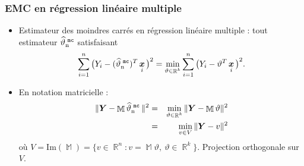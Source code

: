 \documentclass{beamer}
\DeclareMathOperator{\E}{{\mathbb E}}
\DeclareMathOperator{\R}{{\mathbb R}}
\DeclareMathOperator{\bx}{\boldsymbol{x}}
\DeclareMathOperator{\estMC}{\widehat \vartheta_n^{\,\,{\tt mc}}}
\DeclareMathOperator{\design}{\mathbb{M}}
\begin{document}






\begin{frame}
\frametitle{EMC en régression linéaire multiple}
\begin{itemize}
\item Estimateur des \alert{moindres carrés} en régression
linéaire multiple : tout estimateur $\estMC$ satisfaisant
$$\sum_{i = 1}^n
\big(Y_i-(\estMC)^T\bx_i\big)^2 = \min_{\vartheta \in \R^k}\sum_{i =
1}^n \big(Y_i-{\vartheta}^T\bx_i\big)^2.$$
\item En notation matricielle :
\begin{eqnarray*} \|\boldsymbol{Y}-\design\estMC\|^2 &=& \min_{\vartheta \in
\R^k}\|\boldsymbol{Y}-\design\vartheta\|^2\\
&=& \min_{v \in V}\|\boldsymbol{Y}-v\|^2
\end{eqnarray*}
o\`u $V=\text{Im}(\design) = \{v\in \R^n: v=\design\vartheta, \
\vartheta\in \R^k\}$.
 Projection orthogonale sur $V$.
 \end{itemize}
 \end{frame}

\end{document}
